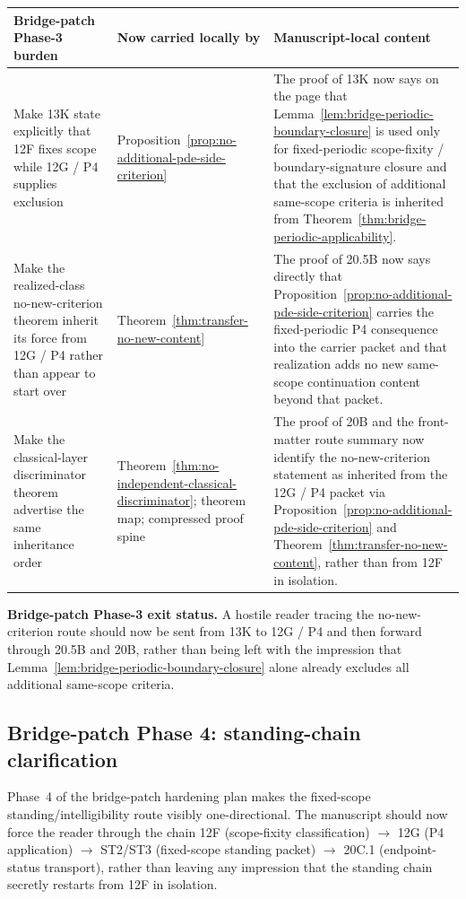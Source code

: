 \begin{center}
\footnotesize
\renewcommand{\arraystretch}{1.16}
\setlength{\tabcolsep}{4pt}
\begin{tabularx}{0.98\textwidth}{@{}L{0.31\textwidth}L{0.24\textwidth}Y@{}}
\toprule
\textbf{Bridge-patch Phase-3 burden} & \textbf{Now carried locally by} & \textbf{Manuscript-local content}\\
\midrule
Make 13K state explicitly that 12F fixes scope while 12G / P4 supplies exclusion & Proposition~\ref{prop:no-additional-pde-side-criterion} & The proof of 13K now says on the page that Lemma~\ref{lem:bridge-periodic-boundary-closure} is used only for fixed-periodic scope-fixity / boundary-signature closure and that the exclusion of additional same-scope criteria is inherited from Theorem~\ref{thm:bridge-periodic-applicability}.\\
Make the realized-class no-new-criterion theorem inherit its force from 12G / P4 rather than appear to start over & Theorem~\ref{thm:transfer-no-new-content} & The proof of 20.5B now says directly that Proposition~\ref{prop:no-additional-pde-side-criterion} carries the fixed-periodic P4 consequence into the carrier packet and that realization adds no new same-scope continuation content beyond that packet.\\
Make the classical-layer discriminator theorem advertise the same inheritance order & Theorem~\ref{thm:no-independent-classical-discriminator}; theorem map; compressed proof spine & The proof of 20B and the front-matter route summary now identify the no-new-criterion statement as inherited from the 12G / P4 packet via Proposition~\ref{prop:no-additional-pde-side-criterion} and Theorem~\ref{thm:transfer-no-new-content}, rather than from 12F in isolation.\\
\bottomrule
\end{tabularx}
\end{center}

\noindent\textbf{Bridge-patch Phase-3 exit status.} A hostile reader tracing the no-new-criterion route should now be sent from 13K to 12G / P4 and then forward through 20.5B and 20B, rather than being left with the impression that Lemma~\ref{lem:bridge-periodic-boundary-closure} alone already excludes all additional same-scope criteria.

\subsection*{Bridge-patch Phase 4: standing-chain clarification}
Phase~4 of the bridge-patch hardening plan makes the fixed-scope standing/intelligibility route visibly one-directional. The manuscript should now force the reader through the chain 12F (scope-fixity classification) $\to$ 12G (P4 application) $\to$ ST2/ST3 (fixed-scope standing packet) $\to$ 20C.1 (endpoint-status transport), rather than leaving any impression that the standing chain secretly restarts from 12F in isolation.

